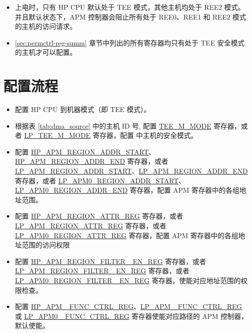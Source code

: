 \documentclass[main\_\_CN.tex]{subfiles}
\begin{document}
\begin{tiplisting}
\vspace{-2em}
\begin{itemize}
    \item 上电时，只有 HP CPU 默认处于 TEE 模式，其他主机均处于 REE2 模式。并且默认状态下，APM 控制器会阻止所有处于 REE0、REE1 和 REE2 模式的主机的访问请求。
    \item \ref{sec:permctrl-reg-summ}  章节中列出的所有寄存器均只有处于 TEE 安全模式的主机才可以配置。
\end{itemize}
\end{tiplisting}

 
\section{配置流程}


\begin{itemize}
    \item 配置 HP CPU 到机器模式（即 TEE 模式）。
    
    \item 根据表 \ref{tab:dma_source} 中的主机 ID 号, 配置 \hyperref[fielddesc:TEEM0MODE]{TEE\_M\_MODE} 寄存器，或者 \hyperref[fielddesc:LPTEEM0MODE]{LP\_TEE\_M\_MODE} 寄存器，配置 \chipname{} 中主机的安全模式。
    
    \item 配置 \hyperref[regdesc:HPAPMREGION0ADDRSTARTREG]{HP\_APM\_REGION\_ADDR\_START}、\hyperref[regdesc:HPAPMREGION0ADDRENDREG]{HP\_APM\_REGION\_ADDR\_END} 寄存器，或者 \hyperref[regdesc:LPAPMREGION0ADDRSTARTREG]{LP\_APM\_REGION\_ADDR\_START}、\hyperref[regdesc:LPAPMREGION0ADDRENDREG]{LP\_APM\_REGION\_ADDR\_END} 寄存器，或者 \hyperref[regdesc:LPAPM0REGION0ADDRSTARTREG]{LP\_APM0\_REGION\_ADDR\_START}、\hyperref[regdesc:LPAPM0REGION0ADDRENDREG]{LP\_APM0\_REGION\_ADDR\_END}  寄存器，配置 APM 寄存器中的各组地址范围。
    
    \item 配置 \hyperref[regdesc:HPAPMREGION0ATTRREG]{HP\_APM\_REGION\_ATTR\_REG} 寄存器，或者 \hyperref[regdesc:LPAPMREGION0ATTRREG]{LP\_APM\_REGION\_ATTR\_REG} 寄存器，或者 \hyperref[regdesc:LPAPM0REGION0ATTRREG]{LP\_APM0\_REGION\_ATTR\_REG} 寄存器，配置 APM 寄存器中的各组地址范围的访问权限
    
    \item 配置 \hyperref[fielddesc:HPAPMREGIONFILTEREN]{HP\_APM\_REGION\_FILTER\_ EN\_REG} 寄存器，或者 \hyperref[fielddesc:LPAPMREGIONFILTEREN]{LP\_APM\_REGION\_FILTER\_ EN\_REG} 寄存器，或者 \hyperref[fielddesc:LPAPM0REGIONFILTEREN]{LP\_APM0\_REGION\_FILTER\_ EN\_REG} 寄存器，使能对应地址范围的权限检查。
    
    \item 配置 \hyperref[regdesc:HPAPMFUNCCTRLREG]{HP\_APM\_ FUNC\_CTRL\_REG}、\hyperref[regdesc:LPAPMFUNCCTRLREG]{LP\_APM \_FUNC\_CTRL\_REG} 或 \hyperref[regdesc:LPAPM0FUNCCTRLREG]{LP\_APM0 \_FUNC\_CTRL\_REG} 寄存器使能对应路径的 APM 控制器，默认使能。
\end{itemize}
\end{document}
